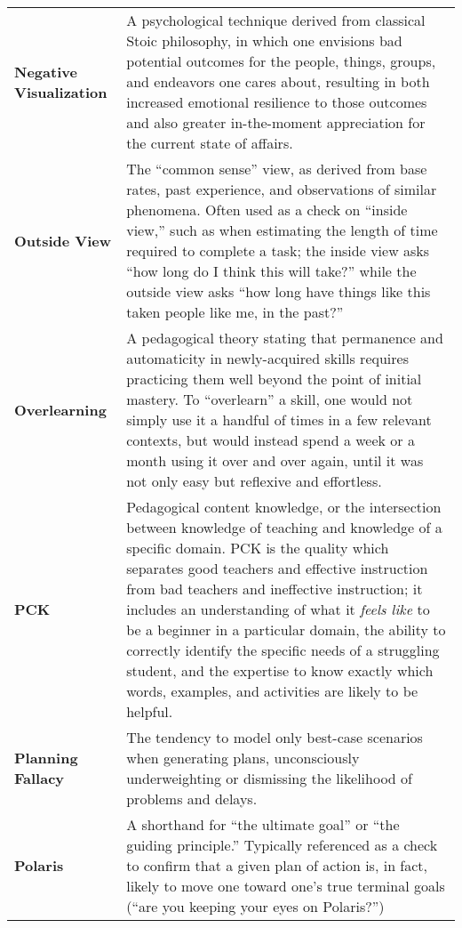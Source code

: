 \begin{longtable} { p{} p{} }
\textbf{Negative Visualization} & A psychological technique derived from classical Stoic philosophy, in which one envisions bad potential outcomes for the people, things, groups, and endeavors one cares about, resulting in both increased emotional resilience to those outcomes and also greater in-the-moment appreciation for the current state of affairs.\\

\textbf{Outside View} & The ``common sense'' view, as derived from base rates, past experience, and observations of similar phenomena.  Often used as a check on ``inside view,'' such as when estimating the length of time required to complete a task; the inside view asks ``how long do I think this will take?'' while the outside view asks ``how long have things like this taken people like me, in the past?''\\

\textbf{Overlearning} & A pedagogical theory stating that permanence and automaticity in newly-acquired skills requires practicing them well beyond the point of initial mastery.  To ``overlearn'' a skill, one would not simply use it a handful of times in a few relevant contexts, but would instead spend a week or a month using it over and over again, until it was not only easy but reflexive and effortless.\\

\textbf{PCK} & Pedagogical content knowledge, or the intersection between knowledge of teaching and knowledge of a specific domain.  PCK is the quality which separates good teachers and effective instruction from bad teachers and ineffective instruction; it includes an understanding of what it \emph{feels like} to be a beginner in a particular domain, the ability to correctly identify the specific needs of a struggling student, and the expertise to know exactly which words, examples, and activities are likely to be helpful.\\

\textbf{Planning Fallacy} & The tendency to model only best-case scenarios when generating plans, unconsciously underweighting or dismissing the likelihood of problems and delays.\\

\textbf{Polaris} & A shorthand for ``the ultimate goal'' or ``the guiding principle.''  Typically referenced as a check to confirm that a given plan of action is, in fact, likely to move one toward one's true terminal goals (``are you keeping your eyes on Polaris?'')\\


\end{longtable}
